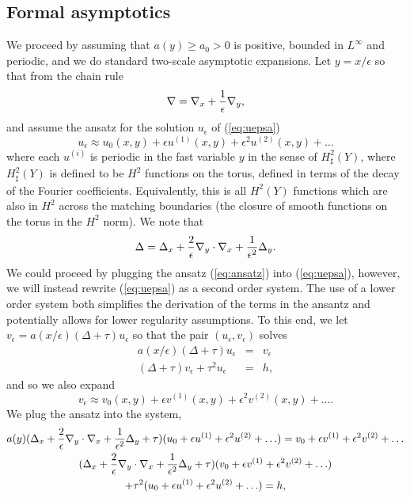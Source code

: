 \documentclass[12pt]{article}
\begin{document}
\subsection{Formal asymptotics} We proceed by assuming that $a(y)\geq a_0>0$  is positive, bounded in $L^\infty$ and periodic, and we do standard two-scale asymptotic expansions. Let $y=x/\epsilon$ so that from the chain rule 
$$\nabla = \nabla_x +{1\over{\epsilon}} \nabla_y , $$
and assume the ansatz for the solution $u_\epsilon$ of (\ref{eq:uepsa})
\begin{equation} \label{eq:ansatz} u_\epsilon \approx u_0(x,y) + \epsilon u^{(1)} (x,y) +\epsilon^2 u^{(2)}(x,y) +\ldots \end{equation}
where each $u^{(i)}$ is periodic in the fast variable $y$ in the sense of $H^2_\sharp(Y)$, where $H^2_\sharp(Y)$ is defined to be $H^2$ functions on the torus, defined in terms of the decay of the Fourier coefficients. Equivalently, this is all $H^2(Y)$ functions which are also in $H^2$ across the matching boundaries (the closure of smooth functions on the torus in the $H^2$ norm). We note that 
$$ \Delta = \Delta_x + {2\over{\epsilon}} \nabla_y\cdot\nabla_x + {1\over{\epsilon^2}} \Delta_y. $$
We could proceed by plugging the ansatz (\ref{eq:ansatz}) into (\ref{eq:uepsa}), however, we will instead rewrite (\ref{eq:uepsa}) as a second order system. The use of a lower order system both simplifies the derivation of the terms in the ansantz and potentially allows for lower regularity assumptions.  To this end, we let $ v_\epsilon = a(x/\epsilon) (\Delta +\tau )u_\epsilon $ so that the pair $(u_\epsilon, v_\epsilon)$ solves
\begin{eqnarray}\label{eq:uepssystem}  a(x/\epsilon) (\Delta +\tau )u_\epsilon  &=& v_\epsilon  \\ (\Delta +\tau )v_\epsilon  +\tau^2 u_\epsilon &=& h, \nonumber\end{eqnarray}
and so we also expand 
\begin{equation} \label{eq:ansatzv} v_\epsilon \approx v_0(x,y) + \epsilon v^{(1)} (x,y) +\epsilon^2 v^{(2)}(x,y) +\ldots .\end{equation}
We plug the ansatz into the system, 
\begin{multline}  a(y) (\Delta_x + {2\over{\epsilon}} \nabla_y\cdot\nabla_x + {1\over{\epsilon^2}} \Delta_y +\tau ) ( u_0 +\epsilon u^{(1)} +\epsilon^2 u^{(2)} +\ldots ) = v_0 +\epsilon v^{(1)} +\epsilon^2 v^{(2)} +\ldots \\ (\Delta_x + {2\over{\epsilon}} \nabla_y\cdot\nabla_x + {1\over{\epsilon^2}} \Delta_y +\tau ) ( v_0 +\epsilon v^{(1)} +\epsilon^2 v^{(2)} +\ldots ) \\ + \tau^2( u_0 +\epsilon u^{(1)} +\epsilon^2 u^{(2)} +\ldots ) = h ,\end{multline} 
\end{document}
